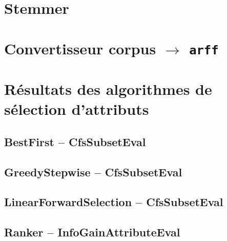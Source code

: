 \section{Stemmer}
\label{annexe:stemmer}


\section{Convertisseur corpus $\rightarrow$ \texttt{arff}}
\label{annexe:conv}


\section{Résultats des algorithmes de sélection d'attributs}
\label{annexe:results}
\subsection{BestFirst -- CfsSubsetEval}


\subsection{GreedyStepwise -- CfsSubsetEval}


\subsection{LinearForwardSelection -- CfsSubsetEval}


\subsection{Ranker -- InfoGainAttributeEval}
